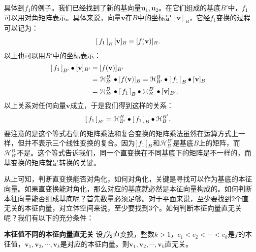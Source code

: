 \documentclass[12pt,UTF8]{ctexbook}
\begin{document}
具体到$f_1$的例子。我们已经找到了新的基向量$\mathbf{u}_1,\mathbf{u}_2$。在它们组成的基底$B'$中，$f_1$可以用对角矩阵表示。具体来说，向量$\mathbf{v}$在$B$中的坐标是$[\mathbf{v}]_B$，它经$f_1$变换的过程可以记为：
$$ 
\bmat{f_1}[B] [\mathbf{v}]_B = [f(\mathbf{v})]_B.
$$
以上也可以用$B'$中的坐标表示：
\begin{align*}
    \bmat{f_1}[B'] \bullet[\mathbf{v}]_{B'} &= [f(\mathbf{v})]_{B'} \\
    &= \mathcal{H}_{B'}^B\bullet [f(\mathbf{v})]_{B}  = \mathcal{H}_{B'}^B \bullet\bmat{f_1}[B] \bullet[\mathbf{v}]_B\\
    &= \mathcal{H}_{B'}^B \bullet \bmat{f_1}[B] \bullet\mathcal{H}_B^{B'}\bullet [\mathbf{v}]_{B'}.
\end{align*}
以上关系对任何向量$\mathbf{v}$成立，于是我们得到这样的关系：
$$
\bmat{f_1}[B'] = \mathcal{H}_{B'}^B\bullet\bmat{f_1}[B]\bullet\mathcal{H}_B^{B'}.
$$
要注意的是这个等式右侧的矩阵乘法和复合变换的矩阵乘法虽然在运算方式上一样，但并不表示三个线性变换的复合。因为$\bmat{f_1}[B]$和$\mathcal{H}_B^{B'}$是基底$B$上的矩阵，而$\mathcal{H}_{B'}^B$不是。这个等式告诉我们，同一个直变换在不同基底下的矩阵是不一样的，而基变换的矩阵就是转换的关键。

从上可知，判断直变换能否对角化，如何对角化，关键是寻找可以作为基底的本征向量。如果直变换能对角化，那么对应的基底就必然是本征向量构成的。如何判断本征向量能否组成基底呢？首先数量必须足够。对于平面来说，至少要找到$2$个直无关的本征向量，对立体空间来说，至少要找到$3$个。如何判断本征向量直无关呢？我们有以下的充分条件：
\begin{tm}{\textbf{本征值不同的本征向量直无关}}
    设$f$为直变换，整数$k>1$，$c_1<c_2<\cdots<c_k$是$f$的本征值，$\mathbf{v}_1,\mathbf{v}_2,\cdots,\mathbf{v}_k$是对应的本征向量。则$\mathbf{v}_1,\mathbf{v}_2,\cdots,\mathbf{v}_k$直无关。
\end{tm}
\end{document}
